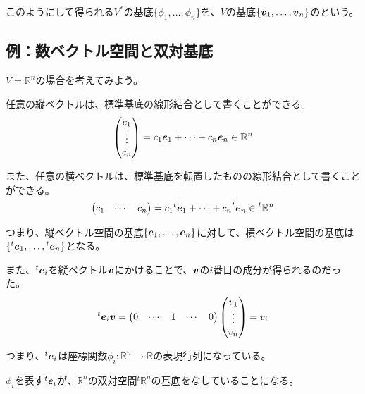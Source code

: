 \documentclass[../../../topic_linear-algebra]{subfiles}
\begin{document}
\br

このようにして得られる$V^*$の基底$\{ \phi_1,\ldots,\phi_n \}$を、$V$の基底$\{ \vb*{v}_1,\ldots,\vb*{v}_n \}$のという。

\subsection{例：数ベクトル空間と双対基底}

$V = \mathbb{R}^n$の場合を考えてみよう。

\br

任意の縦ベクトルは、標準基底の線形結合として書くことができる。
\begin{equation*}
  \begin{pmatrix}
    c_1 \\
    \vdots \\
    c_n
  \end{pmatrix} = c_1 \vb*{e}_1 + \cdots + c_n \vb*{e}_n \in \mathbb{R}^n
\end{equation*}

また、任意の横ベクトルは、標準基底を転置したものの線形結合として書くことができる。
\begin{equation*}
  \begin{pmatrix}
    c_1 & \cdots & c_n
  \end{pmatrix} = c_1 {}^t\vb*{e}_1 + \cdots + c_n {}^t\vb*{e}_n \in {}^t\mathbb{R}^n
\end{equation*}

つまり、縦ベクトル空間の基底$\{ \vb*{e}_1, \ldots, \vb*{e}_n \}$に対して、横ベクトル空間の基底は$\{ {}^t\vb*{e}_1, \ldots, {}^t\vb*{e}_n \}$となる。

\br

また、${}^t\vb*{e}_i$を縦ベクトル$\vb*{v}$にかけることで、$\vb*{v}$の$i$番目の成分が得られるのだった。
\begin{equation*}
  {}^t\vb*{e}_i \vb*{v} = \begin{pmatrix}
    0 & \cdots & 1 & \cdots & 0
  \end{pmatrix} \begin{pmatrix}
    v_1 \\
    \vdots \\
    v_n
  \end{pmatrix} = v_i
\end{equation*}

つまり、${}^t\vb*{e}_i$は座標関数$\phi_i \colon \mathbb{R}^n \to \mathbb{R}$の表現行列になっている。

$\phi_i$を表す${}^t\vb*{e}_i$が、$\mathbb{R}^n$の双対空間${}^t\mathbb{R}^n$の基底をなしていることになる。
\end{document}
